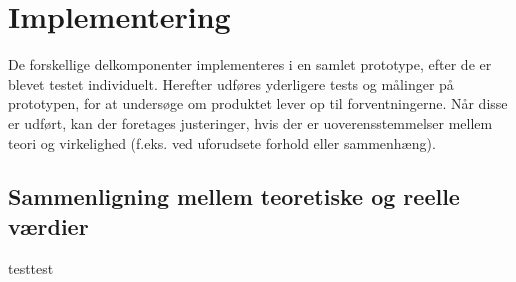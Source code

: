 \documentclass[../main.tex]{subfiles}
\begin{document}
\chapter{Implementering } \label{Chap:Implementering}
De forskellige delkomponenter implementeres i en samlet prototype, efter de er blevet testet individuelt. Herefter udføres yderligere tests og målinger på prototypen, for at undersøge om produktet lever op til forventningerne. Når disse er udført, kan der foretages justeringer, hvis der er uoverensstemmelser mellem teori og virkelighed (f.eks. ved uforudsete forhold eller sammenhæng).

\section{Sammenligning mellem teoretiske og reelle værdier}
testtest
\end{document}
